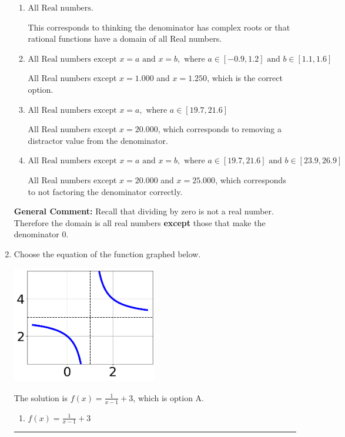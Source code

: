 \documentclass{extbook}[14pt]
\newcommand{\litem}[1]{\item #1

\rule{\textwidth}{0.4pt}}
\begin{document}
\begin{enumerate}
{\begin{enumerate}[label=\Alph*.]
All Real numbers except $x = 1.000$, which corresponds to removing only 1 value from the denominator.
\item \( \text{All Real numbers.} \)

This corresponds to thinking the denominator has complex roots or that rational functions have a domain of all Real numbers.
\item \( \text{All Real numbers except } x = a \text{ and } x = b, \text{ where } a \in [-0.9, 1.2] \text{ and } b \in [1.1, 1.6] \)

All Real numbers except $x = 1.000$ and $x = 1.250$, which is the correct option.
\item \( \text{All Real numbers except } x = a, \text{ where } a \in [19.7, 21.6] \)

All Real numbers except $x = 20.000$, which corresponds to removing a distractor value from the denominator.
\item \( \text{All Real numbers except } x = a \text{ and } x = b, \text{ where } a \in [19.7, 21.6] \text{ and } b \in [23.9, 26.9] \)

All Real numbers except $x = 20.000$ and $x = 25.000$, which corresponds to not factoring the denominator correctly.
\end{enumerate}

\textbf{General Comment:} Recall that dividing by zero is not a real number. Therefore the domain is all real numbers \textbf{except} those that make the denominator 0.
}
\litem{
Choose the equation of the function graphed below.

\begin{center}
    \includegraphics[width=0.5\textwidth]{../Figures/rationalGraphToEquationA.png}
\end{center}


The solution is \( f(x) = \frac{1}{x - 1} + 3 \), which is option A.\begin{enumerate}[label=\Alph*.]
\item \( f(x) = \frac{1}{x - 1} + 3 \)


\end{enumerate}}
\end{enumerate}
\end{document}
